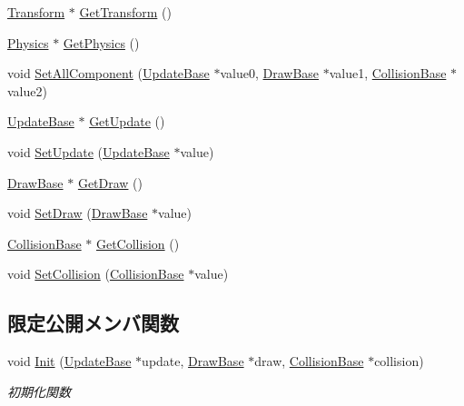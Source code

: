 \begin{DoxyCompactItemize}
\mbox{\hyperlink{class_transform}{Transform}} $\ast$ \mbox{\hyperlink{class_game_object_base_a7df1e16838f8fa578a27e8ba64652b49}{Get\+Transform}} ()
\item 
\mbox{\hyperlink{class_physics}{Physics}} $\ast$ \mbox{\hyperlink{class_game_object_base_a853cdb5dbb2edf28e45e49540f85e554}{Get\+Physics}} ()
\item 
void \mbox{\hyperlink{class_game_object_base_aad0e581dfba83d11af6412a0df6ecd90}{Set\+All\+Component}} (\mbox{\hyperlink{class_update_base}{Update\+Base}} $\ast$value0, \mbox{\hyperlink{class_draw_base}{Draw\+Base}} $\ast$value1, \mbox{\hyperlink{class_collision_base}{Collision\+Base}} $\ast$value2)
\item 
\mbox{\hyperlink{class_update_base}{Update\+Base}} $\ast$ \mbox{\hyperlink{class_game_object_base_a177985be1be1252df6588fa29f2c7f41}{Get\+Update}} ()
\item 
void \mbox{\hyperlink{class_game_object_base_a71704e8310b3183f3f88869f8fd27d08}{Set\+Update}} (\mbox{\hyperlink{class_update_base}{Update\+Base}} $\ast$value)
\item 
\mbox{\hyperlink{class_draw_base}{Draw\+Base}} $\ast$ \mbox{\hyperlink{class_game_object_base_acb893b1827cb7fbb27f0caf6a8e0fb88}{Get\+Draw}} ()
\item 
void \mbox{\hyperlink{class_game_object_base_ab548b4208b8da2af6e3abb533ea53da9}{Set\+Draw}} (\mbox{\hyperlink{class_draw_base}{Draw\+Base}} $\ast$value)
\item 
\mbox{\hyperlink{class_collision_base}{Collision\+Base}} $\ast$ \mbox{\hyperlink{class_game_object_base_a8158138ea811db49445845d8aaacaf3a}{Get\+Collision}} ()
\item 
void \mbox{\hyperlink{class_game_object_base_a4aeb0212f5a390570d050bfef51b7818}{Set\+Collision}} (\mbox{\hyperlink{class_collision_base}{Collision\+Base}} $\ast$value)
\end{DoxyCompactItemize}
\subsection*{限定公開メンバ関数}
\begin{DoxyCompactItemize}
\item 
void \mbox{\hyperlink{class_game_object_base_aca14cf5d66f945347653c4965876e75b}{Init}} (\mbox{\hyperlink{class_update_base}{Update\+Base}} $\ast$update, \mbox{\hyperlink{class_draw_base}{Draw\+Base}} $\ast$draw, \mbox{\hyperlink{class_collision_base}{Collision\+Base}} $\ast$collision)
\begin{DoxyCompactList}\small\item\em 初期化関数 \end{DoxyCompactList}\end{DoxyCompactItemize}

